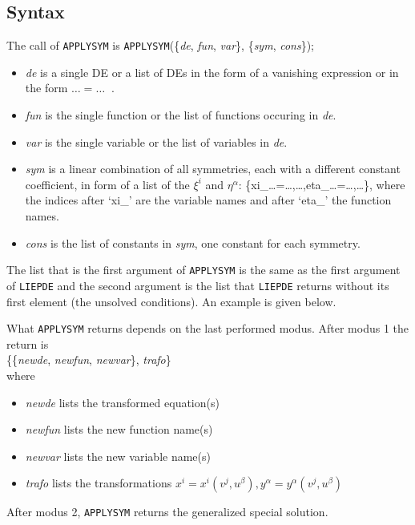 \documentclass[12pt]{article}
\begin{document}
\subsection{Syntax}
The call of {\tt APPLYSYM} is
{\tt APPLYSYM}(\{{\it de}, {\it fun}, {\it var}\}, \{{\it sym}, {\it cons}\});
\begin{itemize}
\item {\it de} is a single DE or a list of DEs in the form of a vanishing
      expression or in the form $\ldots=\ldots\;\;$.
\item {\it fun} is the single function or the list of functions occuring
      in {\it de}.
\item {\it var} is the single variable or the list of variables in {\it de}.
\item {\it sym} is a linear combination of all symmetries, each with a
      different constant coefficient, in form of a list of the $\xi^i$ and
      $\eta^\alpha$: \{xi\_\ldots=\ldots,\ldots,eta\_\ldots=\ldots,\ldots\},
      where the indices after `xi\_' are the variable names and after `eta\_'
      the function names.
\item {\it cons} is the list of constants in {\it sym}, one constant for each
      symmetry.
\end{itemize}
The list that is the first argument of {\tt APPLYSYM} is the same as the
first argument of {\tt LIEPDE} and the
second argument is the list that {\tt LIEPDE} returns without its first
element (the unsolved conditions). An example is given below.

What {\tt APPLYSYM} returns depends on the last performed modus.
After modus 1 the return is \\
\{\{{\it newde}, {\it newfun}, {\it newvar}\}, {\it trafo}\} \\
where
\begin{itemize}
\item {\it newde} lists the transformed equation(s)
\item {\it newfun} lists the new function name(s)
\item {\it newvar} lists the new variable name(s)
\item {\it trafo} lists the transformations $x^i=x^i(v^j,u^\beta),
      y^\alpha=y^\alpha(v^j,u^\beta)$
\end{itemize}
After modus 2, {\tt APPLYSYM} returns the generalized special solution.
\end{document}
